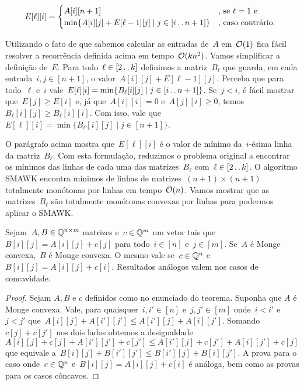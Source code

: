 \begin{equation*}
E[\ell][i] = \begin{cases}
    A[i][n+1]                                                   & \text{, se } \ell = 1 \text{ e } \\
    \min\{ A[i][j] + E[\ell-1][j] \mid j \in [i \,.\,.\, n+1] \}     & \text{, caso contrário. }
\end{cases}
\end{equation*}

Utilizando o fato de que sabemos calcular as entradas de~$A$ em~$\mathcal{O}(1)$ fica fácil resolver a recorrência definida acima em tempo~${ \mathcal{O}(kn^2) }$. Vamos simplificar a definição de~$E$. Para todo~${ \ell \in [2 \,.\,.\, k] }$ definimos a matriz~$B_\ell$ que guarda, em cada entrada~${ i,j \in [n+1] }$, o valor~${ A[i][j] + E[\ell-1][j] }$. Perceba que para todo~$\ell$ e~$i$ vale~${ E[\ell][i] = \min\{ B_\ell[i][j] \mid j \in [i \,.\,.\, n+1] \}}$. Se~${ j < i }$, é fácil mostrar que~${ E[j] \geq E[i] }$ e, já que~${ A[i][i] = 0 }$ e~${ A[j][i] \geq 0 }$, temos~${ B_\ell[i][j] \geq B_\ell[i][i] }$. Com isso, vale que~${ E[\ell][i] = \min\{ B_\ell[i][j] \mid j \in [n+1] \} }$. 

O parágrafo acima mostra que~$E[\ell][i]$ é o valor de mínimo da~$i$-ésima linha da matriz~$B_\ell$. Com esta formulação, reduzimos o problema original a encontrar os mínimos das linhas de cada uma das matrizes~$B_\ell$ com~$\ell \in [2 \,.\,.\, k]$. O algoritmo SMAWK encontra mínimos de linhas de matrizes~${ (n+1) \times (n+1) }$ totalmente monótonas por linhas em tempo~$\mathcal{O}(n)$. Vamos mostrar que as matrizes~$B_\ell$ são totalmente monótonas convexas por linhas para podermos aplicar o SMAWK.

\begin{lema} \label{Monge:keepConvex}
Sejam~${ A,B \in \mathbb{Q}^{n \times m} }$ matrizes e~${ c \in \mathbb{Q}^m }$ um vetor tais que~${ B[i][j] = A[i][j] + c[j] }$ para todo~${ i \in [n] }$ e~${ j \in [m] }$. Se~$A$ é Monge convexa,~$B$ é Monge convexa. O mesmo vale se~$c \in \mathbb{Q}^n$ e~${B[i][j] = A[i][j] + c[i]}$. Resultados análogos valem nos casos de concavidade.
\end{lema}

\begin{proof}
Sejam $A,B$ e $c$ definidos como no enunciado do teorema. Suponha que $A$ é Monge convexa. Vale, para quaisquer~${ i,i' \in [n]}$ e~${ j,j' \in [m] }$ onde~${ i < i' }$ e~${ j < j' }$ que~${A[i][j] + A[i'][j'] \leq A[i'][j] + A[i][j']}$. Somando~${ c[j] + c[j'] }$ nos dois lados obtemos a desigualdade~${A[i][j] + c[j] + A[i'][j'] + c[j'] \leq A[i'][j] + c[j'] + A[i][j'] + c[j]}$ que equivale a~${B[i][j] + B[i'][j'] \leq B[i'][j] + B[i][j']}$. A prova para o caso onde~$c \in \mathbb{Q}^n$ e~${B[i][j] = A[i][j] + c[i]}$ é análoga, bem como as provas para os casos côncavos.
\end{proof}

